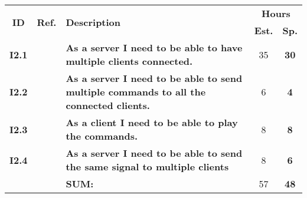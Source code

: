   \label{tab:sprint2stories}
 \def\arraystretch{1.25}
 
\begin{longtable}{ccXcc}
\toprule[0.5mm]
\multirow{2}{*}{\textbf{ID}} &
\multirow{2}{*}{\textbf{Ref.}} & \multirow{2}{*}{\textbf{Description}} & \multicolumn{2}{c}{\textbf{Hours}} \\
 				& & & \textbf{Est.} & \textbf{Sp.} \\ 				
\midrule

\textbf{I2.1} 	& {?} & {\bf As a server I need to be able to have multiple clients connected.} 							& 	35	& \textbf{30} \\
	
\textbf{I2.2} 	& {?} & {\bf As a server I need to be able to send multiple commands to all the connected clients.} 		& 	6	& \textbf{4} \\

\textbf{I2.3} 	& {?} & {\bf  As a client I need to be able to play the commands.}										& 	8	& \textbf{8} \\
\textbf{I2.4} 	& {?} & {\bf  As a server I need to be able to send the same signal to multiple clients} 				& 	8	& \textbf{6} \\		
				
\hline
				&& \textbf{SUM:}		&		57	& \textbf{48}\\																			
\bottomrule[0.5mm]
\end{longtable}